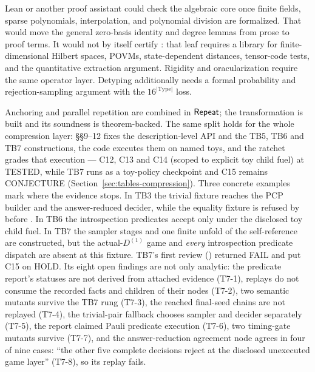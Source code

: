Lean or another proof assistant could check the algebraic core once finite
fields, sparse polynomials, interpolation, and polynomial division are
formalized.  That would move the general zero-basis identity and degree lemmas
from prose to proof terms.  It would not by itself certify
: that leaf requires a library for finite-dimensional
Hilbert spaces, POVMs, state-dependent distances, tensor-code tests, and the
quantitative extraction argument.  Rigidity and oracularization require the
same operator layer.  Detyping additionally needs a formal probability and
rejection-sampling argument with the \(16^{|\mathrm{Type}|}\) loss.

\enlargethispage{\baselineskip}
Anchoring and parallel repetition are combined in \(\mathsf{Repeat}\); the
transformation is built and its soundness is theorem-backed.  The same split
holds for the whole compression layer:  \S\S9--12 fixes
the description-level API and the TB5, TB6 and TB7 constructions, the code
executes them on named toys, and the ratchet grades that execution --- C12,
C13 and C14 (scoped to explicit toy child fuel) at \textsc{TESTED}, while TB7
runs as a toy-policy checkpoint and C15 remains \textsc{CONJECTURE}
(Section~\ref{sec:tables-compression}).  Three concrete examples mark where the
evidence stops.  In TB3 the trivial fixture reaches the PCP builder and the
answer-reduced decider, while the equality fixture is refused by
 before .  In TB6 the introspection predicates
accept only under the disclosed toy child fuel.  In TB7 the sampler stages and
one finite unfold of the self-reference are constructed, but the actual-\(D^{(1)}\)
game and \emph{every} introspection predicate dispatch are absent at this
fixture.  TB7's first review () returned FAIL and put
C15 on HOLD.  Its eight open findings are not only analytic: the predicate
report's statuses are not derived from attached evidence (T7-1), 
replays do not consume the recorded facts and children of their nodes (T7-2),
two semantic mutants survive the TB7 rung (T7-3), the reached final-seed chains
are not replayed (T7-4), the trivial-pair fallback chooses sampler and decider
separately (T7-5), the report claimed Pauli predicate execution (T7-6), two
timing-gate mutants survive (T7-7), and the answer-reduction agreement node
agrees in four of nine cases: ``the other five complete decisions reject at the
disclosed unexecuted game layer'' (T7-8), so its  replay fails.
